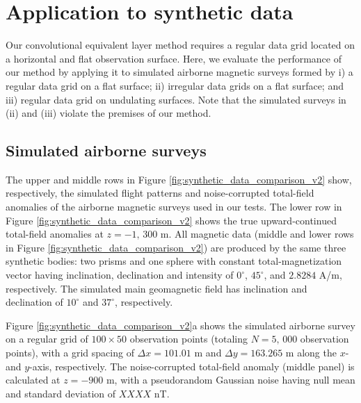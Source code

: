 \section{Application to synthetic data}

Our convolutional equivalent layer method requires a regular data grid located on a 
horizontal and flat observation surface.
Here, we evaluate the performance of our method by applying it to simulated airborne magnetic 
surveys formed by
i) a regular data grid on a flat surface;
ii) irregular data grids on a flat surface; and 
iii) regular data grid on undulating surfaces.
Note that the simulated surveys in (ii) and (iii) violate the premises of our method. 

\subsection*{Simulated airborne surveys}

The upper and middle rows in Figure \ref{fig:synthetic_data_comparison_v2} show, respectively, 
the simulated flight patterns and noise-corrupted total-field anomalies of the airborne magnetic 
surveys used in our tests. The lower row in Figure \ref{fig:synthetic_data_comparison_v2} shows 
the true upward-continued total-field anomalies at $z = -1, \, 300$ m.
All magnetic data (middle and lower rows in Figure \ref{fig:synthetic_data_comparison_v2}) 
are produced by the same three synthetic bodies: two prisms and one sphere with 
constant total-magnetization vector having inclination, declination and intensity of 
$0^{\circ}$, $45^{\circ}$, and $2.8284$ A/m, respectively. 
The simulated main geomagnetic field has inclination and declination of $10^{\circ}$ and $37^{\circ}$,
respectively. 


Figure \ref{fig:synthetic_data_comparison_v2}a shows the simulated airborne survey on
a regular grid of $100 \times 50$ observation points (totaling  $N = 5,\, 000$ observation points),
with a grid spacing of $\Delta x = 101.01$ m and $\Delta y = 163.265$ m along the
$x$- and $y$-axis, respectively.
The noise-corrupted total-field anomaly (middle panel) is calculated at $z = -900$ m, with a
pseudorandom Gaussian noise having null mean and standard deviation of $XXXX$ nT.


